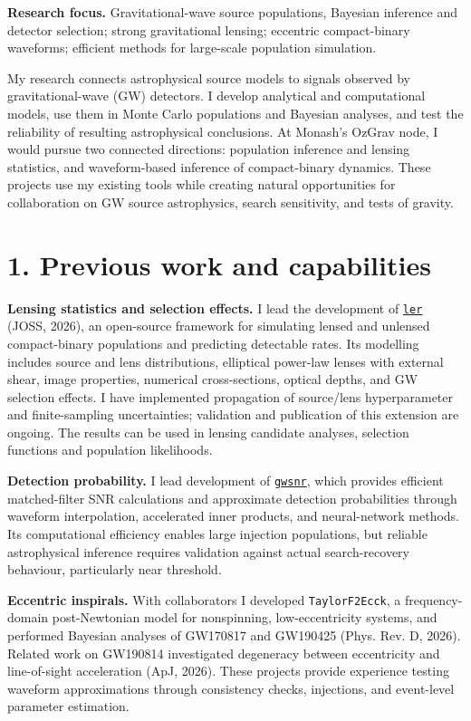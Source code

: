 \documentclass[11pt]{article}
\newcommand{\firstheading}[2]{\thispagestyle{plain}{\LARGE\bfseries\color{accent}#1}\par\vspace{3pt}{#2}\par\vspace{4pt}{\color{accent}\hrule}\vspace{8pt}}
\begin{document}
\firstheading{Research interests and proposed directions}{Phurailatpam Hemantakumar\quad|\quad Monash OzGrav Research Fellow (698908)}
\textbf{Research focus.} Gravitational-wave source populations, Bayesian inference and detector selection; strong gravitational lensing; eccentric compact-binary waveforms; efficient methods for large-scale population simulation.

My research connects astrophysical source models to signals observed by gravitational-wave (GW) detectors. I develop analytical and computational models, use them in Monte Carlo populations and Bayesian analyses, and test the reliability of resulting astrophysical conclusions. At Monash's OzGrav node, I would pursue two connected directions: population inference and lensing statistics, and waveform-based inference of compact-binary dynamics. These projects use my existing tools while creating natural opportunities for collaboration on GW source astrophysics, search sensitivity, and tests of gravity.

\section*{1. Previous work and capabilities}
\textbf{Lensing statistics and selection effects.} I lead the development of \href{https://ler.hemantaph.com/}{\texttt{ler}} (JOSS, 2026), an open-source framework for simulating lensed and unlensed compact-binary populations and predicting detectable rates. Its modelling includes source and lens distributions, elliptical power-law lenses with external shear, image properties, numerical cross-sections, optical depths, and GW selection effects. I have implemented propagation of source/lens hyperparameter and finite-sampling uncertainties; validation and publication of this extension are ongoing. The results can be used in lensing candidate analyses, selection functions and population likelihoods.

\textbf{Detection probability.} I lead development of \href{https://gwsnr.hemantaph.com/}{\texttt{gwsnr}}, which provides efficient matched-filter SNR calculations and approximate detection probabilities through waveform interpolation, accelerated inner products, and neural-network methods. Its computational efficiency enables large injection populations, but reliable astrophysical inference requires validation against actual search-recovery behaviour, particularly near threshold.

\textbf{Eccentric inspirals.} With collaborators I developed \texttt{TaylorF2Ecck}, a frequency-domain post-Newtonian model for nonspinning, low-eccentricity systems, and performed Bayesian analyses of GW170817 and GW190425 (Phys. Rev. D, 2026). Related work on GW190814 investigated degeneracy between eccentricity and line-of-sight acceleration (ApJ, 2026). These projects provide experience testing waveform approximations through consistency checks, injections, and event-level parameter estimation.
\end{document}

